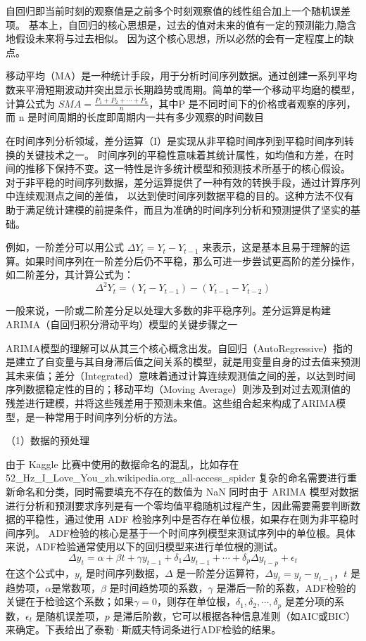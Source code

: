 自回归即当前时刻的观察值是之前多个时刻观察值的线性组合加上一个随机误差项。
基本上，自回归的核心思想是，过去的值对未来的值有一定的预测能力,隐含地假设未来将与过去相似。
因为这个核心思想，所以必然的会有一定程度上的缺点。

移动平均（MA）是一种统计手段，用于分析时间序列数据。通过创建一系列平均数来平滑短期波动并突出显示长期趋势或周期。简单的举一个移动平均磨的模型，计算公式为 $SMA = \frac{P_1 + P_2 + \cdots + P_n}{n}$，其中P 是不同时间下的价格或者观察的序列，
而 n 是时间周期的长度即周期内一共有多少观察的时间数目

在时间序列分析领域，差分运算（I）是实现从非平稳时间序列到平稳时间序列转换的关键技术之一。
时间序列的平稳性意味着其统计属性，如均值和方差，在时间的推移下保持不变。这一特性是许多统计模型和预测技术所基于的核心假设。
对于非平稳的时间序列数据，差分运算提供了一种有效的转换手段，通过计算序列中连续观测点之间的差值，
以达到使时间序列数据平稳的目的。这种方法不仅有助于满足统计建模的前提条件，而且为准确的时间序列分析和预测提供了坚实的基础。

例如，一阶差分可以用公式 $\Delta Y_t = Y_t - Y_{t - 1}$ 来表示，这是基本且易于理解的运算。如果时间序列在一阶差分后仍不平稳，那么可进一步尝试更高阶的差分操作，如二阶差分，其计算公式为：
\begin{equation}
	\Delta^2 Y_t = (Y_t - Y_{t - 1}) - (Y_{t - 1} - Y_{t - 2})
\end{equation}

一般来说，一阶或二阶差分足以处理大多数的非平稳序列。差分运算是构建ARIMA（自回归积分滑动平均）模型的关键步骤之一

ARIMA模型的理解可以从其三个核心概念出发。自回归（AutoRegressive）指的是建立了自变量与其自身滞后值之间关系的模型，就是用变量自身的过去值来预测其未来值；差分（Integrated）意味着通过计算连续观测值之间的差，以达到时间序列数据稳定性的目的；移动平均（Moving Average）则涉及到对过去观测值的残差进行建模，并将这些残差用于预测未来值。这些组合起来构成了ARIMA模型，是一种常用于时间序列分析的方法。

（1）数据的预处理

由于 Kaggle 比赛中使用的数据命名的混乱，比如存在 52\_Hz\_I\_Love\_You\_zh.wikipedia.org\_all-access\_spider
复杂的命名需要进行重新命名和分类，同时需要填充不存在的数值为 NaN
同时由于 ARIMA 模型对数据进行分析和预测要求序列是有一个零均值平稳随机过程产生，因此需要需要判断数据的平稳性\cite{赵鹏2020基于}，通过使用 ADF 检验序列中是否存在单位根，如果存在则为非平稳时间序列。
ADF检验的核心是基于一个时间序列模型来测试序列中的单位根。具体来说，ADF检验通常使用以下的回归模型来进行单位根的测试。
\begin{equation}
	\Delta y_t = \alpha + \beta t + \gamma y_{t-1} + \delta_1 \Delta y_{t-1} + \cdots + \delta_p \Delta y_{t-p} + \epsilon_t
\end{equation}
在这个公式中，$y_t$ 是时间序列数据，$\Delta$ 是一阶差分运算符，$\Delta y_t = y_t - y_{t-1}$，$t$ 是趋势项，$\alpha$是常数项，$\beta$ 是时间趋势项的系数，$\gamma$ 是滞后一阶的系数，ADF检验的关键在于检验这个系数；如果$\gamma = 0$，则存在单位根，$\delta_1, \delta_2, \cdots, \delta_p$ 是差分项的系数，$\epsilon_t$ 是随机误差项，$p$ 是滞后阶数，它可以根据各种信息准则（如AIC或BIC）来确定。下表给出了泰勒·斯威夫特词条进行ADF检验的结果。

